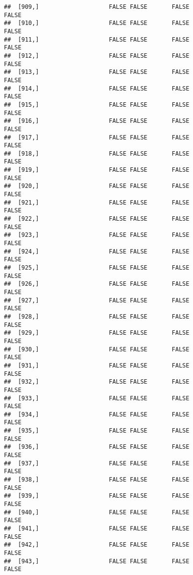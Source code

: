 \documentclass[
]{article}
\begin{document}
\begin{verbatim}
##  [909,]                    FALSE FALSE       FALSE                FALSE
##  [910,]                    FALSE FALSE       FALSE                FALSE
##  [911,]                    FALSE FALSE       FALSE                FALSE
##  [912,]                    FALSE FALSE       FALSE                FALSE
##  [913,]                    FALSE FALSE       FALSE                FALSE
##  [914,]                    FALSE FALSE       FALSE                FALSE
##  [915,]                    FALSE FALSE       FALSE                FALSE
##  [916,]                    FALSE FALSE       FALSE                FALSE
##  [917,]                    FALSE FALSE       FALSE                FALSE
##  [918,]                    FALSE FALSE       FALSE                FALSE
##  [919,]                    FALSE FALSE       FALSE                FALSE
##  [920,]                    FALSE FALSE       FALSE                FALSE
##  [921,]                    FALSE FALSE       FALSE                FALSE
##  [922,]                    FALSE FALSE       FALSE                FALSE
##  [923,]                    FALSE FALSE       FALSE                FALSE
##  [924,]                    FALSE FALSE       FALSE                FALSE
##  [925,]                    FALSE FALSE       FALSE                FALSE
##  [926,]                    FALSE FALSE       FALSE                FALSE
##  [927,]                    FALSE FALSE       FALSE                FALSE
##  [928,]                    FALSE FALSE       FALSE                FALSE
##  [929,]                    FALSE FALSE       FALSE                FALSE
##  [930,]                    FALSE FALSE       FALSE                FALSE
##  [931,]                    FALSE FALSE       FALSE                FALSE
##  [932,]                    FALSE FALSE       FALSE                FALSE
##  [933,]                    FALSE FALSE       FALSE                FALSE
##  [934,]                    FALSE FALSE       FALSE                FALSE
##  [935,]                    FALSE FALSE       FALSE                FALSE
##  [936,]                    FALSE FALSE       FALSE                FALSE
##  [937,]                    FALSE FALSE       FALSE                FALSE
##  [938,]                    FALSE FALSE       FALSE                FALSE
##  [939,]                    FALSE FALSE       FALSE                FALSE
##  [940,]                    FALSE FALSE       FALSE                FALSE
##  [941,]                    FALSE FALSE       FALSE                FALSE
##  [942,]                    FALSE FALSE       FALSE                FALSE
##  [943,]                    FALSE FALSE       FALSE                FALSE

\end{verbatim}
\end{document}
